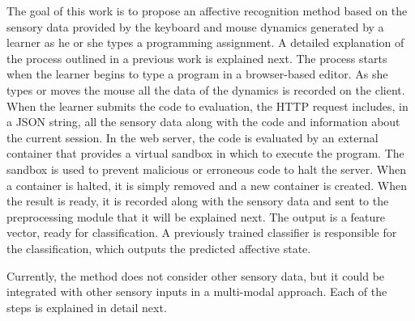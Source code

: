 \documentclass[a4paper,twoside]{article}
\begin{document}
The goal of this work is to propose an affective
recognition method based on the sensory data provided by the keyboard and mouse
dynamics generated by a learner as he or she types a programming assignment.
A detailed explanation of the process outlined in a previous work \cite{ijcci17} is explained next.
The process starts when the
learner begins to type a program in a browser-based editor. As she types or
moves the mouse all the data of the dynamics is recorded on the client.
When the learner submits the code to evaluation, the HTTP request includes,
in a JSON string, all the sensory data along with the code and
information about the current session.
In the web server, the code is evaluated by an
external container that provides a virtual sandbox in which to execute the
program. The sandbox is used to prevent malicious or
erroneous code to halt the server. When a container is halted, it is simply
removed and a new container is created.
When the result is ready, it is recorded
along with the sensory data and sent to the preprocessing module that it will
be explained next. The output is a feature vector, ready for classification. A
previously trained classifier is responsible for the classification, which
outputs the predicted affective state.

Currently, the method does not consider other sensory data,
but it could be integrated with other sensory inputs in a multi-modal
approach.  Each of the steps is explained in detail next.
\end{document}
